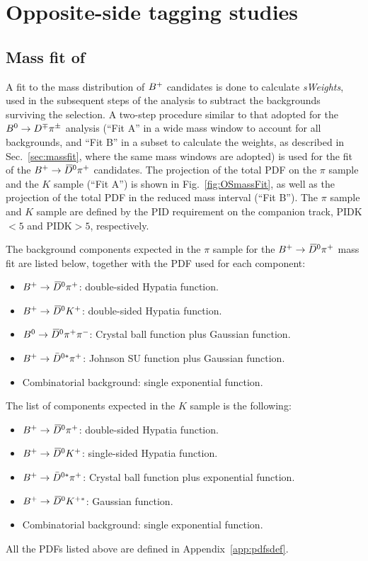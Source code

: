 \section{Opposite-side tagging studies}
\label{app:OS}

\subsection[Mass fit of $\Bp\to\Dzb\pip$]{Mass fit of \boldmath{$\Bp\to\Dzb\pip$}}
\label{app:OSmassFit}

A fit to the mass distribution of $B^+$ candidates is done to calculate \emph{sWeights},
used in the subsequent steps of the analysis to subtract the backgrounds surviving the selection.
A two-step procedure similar to that adopted for the $B^0\rightarrow D^\mp\pi^\pm$ analysis (``Fit A'' in a
wide mass window to account for all backgrounds, and ``Fit B'' in a subset to calculate the weights,
as described in Sec.~\ref{sec:massfit}, where the same mass windows are adopted) is used for the fit of the $\Bp\to\Dzb\pip$ candidates.
The projection of the total PDF on the $\pi$ sample and the $K$ sample (``Fit A'') is shown in
Fig.~\ref{fig:OSmassFit}, as well as the projection of the total PDF in the reduced mass interval (``Fit B'').
The $\pi$ sample and $K$ sample are defined by the PID requirement
on the companion track, PIDK$<5$ and PIDK$>5$, respectively.

The background components expected in the $\pi$ sample for the $\Bp\to\Dzb\pip$ mass fit are listed below,
together with the PDF used for each component:
\begin{itemize}[noitemsep,topsep=0pt]
  \item $\Bp\to\Dzb\pip$: double-sided Hypatia function.
  \item $B^+\rightarrow\kern 0.2em\overline{\kern -0.2em D}{}^0K^+$: double-sided Hypatia function.
  \item $B^0\rightarrow\kern 0.2em\overline{\kern -0.2em D}{}^0\pi^+\pi^-$: Crystal ball function plus Gaussian function.
  \item $B^+\rightarrow\bar D^{0*}\pi^+$: Johnson SU function plus Gaussian function.
  \item Combinatorial background: single exponential function.  
\end{itemize}
The list of components expected in the $K$ sample is the following:
\begin{itemize}[noitemsep,topsep=0pt]
  \item $\Bp\to\Dzb\pip$: double-sided Hypatia function.
  \item $B^+\rightarrow\kern 0.2em\overline{\kern -0.2em D}{}^0K^+$: single-sided Hypatia function.
  \item $B^+\rightarrow\bar D^{0*}\pi^+$: Crystal ball function plus exponential function.
  \item $B^+\rightarrow\kern 0.2em\overline{\kern -0.2em D}{}^0 K^{+*}$: Gaussian function.
  \item Combinatorial background: single exponential function.  
\end{itemize}
All the PDFs listed above are defined in Appendix~\ref{app:pdfsdef}. 


